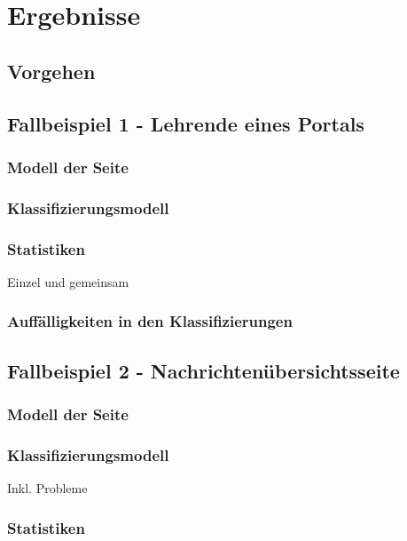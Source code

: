 \chapter{Ergebnisse}
    \label{chapter:Findings}
    \section{Vorgehen}
    \section{Fallbeispiel 1 - Lehrende eines Portals}
        \subsection{Modell der Seite}
        \subsection{Klassifizierungsmodell}
        \subsection{Statistiken}
            Einzel und gemeinsam
        \subsection{Auffälligkeiten in den Klassifizierungen}

    \section{Fallbeispiel 2 - Nachrichtenübersichtsseite}
        \subsection{Modell der Seite}
        \subsection{Klassifizierungsmodell}
            Inkl. Probleme
        \subsection{Statistiken}
